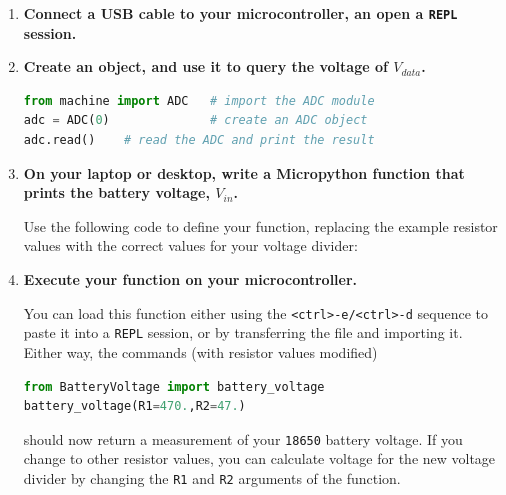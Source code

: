 \begin{enumerate}[resume]
	\item \textbf{Connect a USB cable to your microcontroller, an open a \texttt{REPL} session.}
	
	\item \textbf{Create an \adc object, and use it to query the voltage of $V_{data}$.}
\begin{lstlisting}[language=Python]
from machine import ADC   # import the ADC module
adc = ADC(0)              # create an ADC object
adc.read()    # read the ADC and print the result
\end{lstlisting}	

	\item \textbf{On your laptop or desktop, write a Micropython function that prints the battery voltage, $V_{in}$.}
	
	Use the following code to define your function, replacing the example resistor values with the correct values for your voltage divider:

	
	
	\item \textbf{Execute your function on your microcontroller.}
	
	You can load this function either using the \texttt{<ctrl>-e/<ctrl>-d} sequence to paste it into a \texttt{REPL} session, or by transferring the file and importing it.
	Either way, the commands (with resistor values modified)
\begin{lstlisting}[language=Python]
from BatteryVoltage import battery_voltage
battery_voltage(R1=470.,R2=47.)
\end{lstlisting}	
	should now return a measurement of your \texttt{\texttt{18650}} battery voltage.	
	If you change to other resistor values, you can calculate voltage for the new voltage divider by changing the \texttt{R1} and \texttt{R2} arguments of the function.
\end{enumerate}


